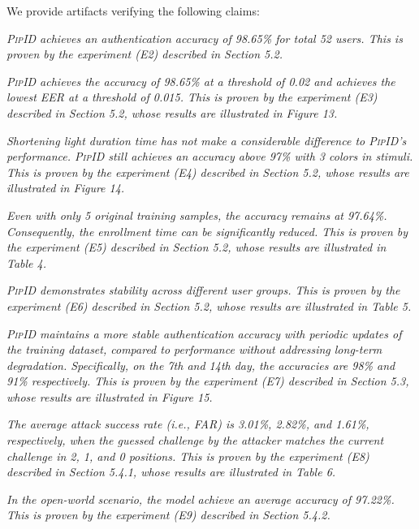 \documentclass[sigconf]{acmart}
\newcommand{\sysname}{\textsc{PipID}\xspace}
\begin{document}
We provide artifacts verifying the following claims:
\begin{compactitem}
\item[(C1):]
  \emph{\sysname achieves an authentication accuracy of 98.65\% for total 52 users. This is proven by the experiment (E2) described in Section 5.2.}

\item[(C2):]
  \emph{\sysname achieves the accuracy of 98.65\% at a threshold of 0.02 and achieves the lowest EER at a threshold of 0.015. This is proven by the experiment (E3) described in Section 5.2, whose results are illustrated in Figure 13.}

\item[(C3):]
  \emph{Shortening light duration time has not make a considerable difference to \sysname’s performance. \sysname still achieves an accuracy above 97\% with 3 colors in stimuli. This is proven by the experiment (E4) described in Section 5.2, whose results are illustrated in Figure 14.}

\item[(C4):]
  \emph{Even with only 5 original training samples, the accuracy remains at 97.64\%. Consequently, the enrollment time can be significantly reduced. This is proven by the experiment (E5) described in Section 5.2, whose results are illustrated in Table 4.}
  
\item[(C5):]
  \emph{\sysname demonstrates stability across different user groups. This is proven by the experiment (E6) described in Section 5.2, whose results are illustrated in Table 5.}

\item[(C6):]
  \emph{\sysname maintains a more stable authentication accuracy with periodic updates of the training dataset, compared to performance without addressing long-term degradation. Specifically, on the 7th and 14th day, the accuracies are 98\% and 91\% respectively. This is proven by the experiment (E7) described in Section 5.3, whose results are illustrated in Figure 15.}

\item[(C7):]
  \emph{The average attack success rate (i.e., FAR) is 3.01\%, 2.82\%, and 1.61\%, respectively, when the guessed challenge by the attacker matches the current challenge in 2, 1, and 0 positions. This is proven by the experiment (E8) described in Section 5.4.1, whose results are illustrated in Table 6.}

\item[(C8):]
  \emph{In the open-world scenario, the model achieve an average accuracy of 97.22\%. This is proven by the experiment (E9) described in Section 5.4.2.}


\end{compactitem}
\end{document}
